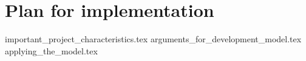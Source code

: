 \section{Plan for implementation}
{important_project_characteristics.tex}
{arguments_for_development_model.tex}
{applying_the_model.tex}